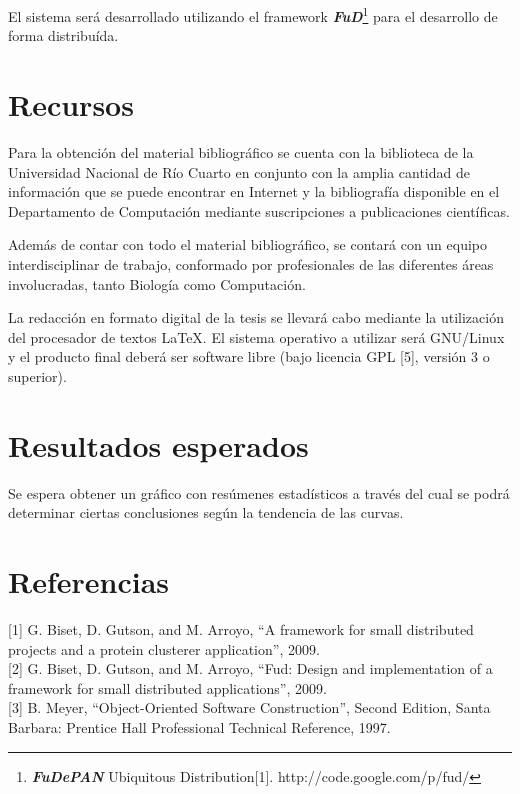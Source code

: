 \documentclass[12pt,a4paper]{article}
\begin{document}
\par El sistema será desarrollado utilizando el framework \textbf{\textit{FuD}}\footnote{\textbf{\textit{FuDePAN}} Ubiquitous Distribution[1]. http://code.google.com/p/fud/} para el desarrollo de forma distribuída.

\section{Recursos}

\par Para la obtención del material bibliográfico se cuenta con la biblioteca de la Universidad Nacional de Río Cuarto en conjunto con la amplia cantidad de información que se puede encontrar en Internet y la bibliografía disponible en el Departamento de Computación mediante suscripciones a publicaciones científicas.

\par Además de contar con todo el material bibliográfico, se contará con un equipo interdisciplinar de trabajo, conformado por profesionales de las diferentes áreas involucradas, tanto Biología como Computación. 

\par La redacción en formato digital de la tesis se llevará cabo mediante la utilización del procesador de textos \LaTeX. El sistema operativo a utilizar será GNU/Linux y el producto final deberá ser software libre (bajo licencia GPL [5], versión 3 o superior).

\section{Resultados esperados}
Se espera obtener un gráfico con resúmenes estadísticos a través del cual se podrá determinar ciertas conclusiones según la tendencia de las curvas. 

\section*{Referencias}
[1] G. Biset, D. Gutson, and M. Arroyo, “A framework for small distributed projects and a protein clusterer application”, 2009. \\

[2] G. Biset, D. Gutson, and M. Arroyo, “Fud: Design and implementation of a framework for small distributed applications”, 2009. \\

[3] B. Meyer, “Object-Oriented Software Construction”, Second Edition, Santa Barbara: Prentice Hall Professional Technical Reference, 1997. \\
\end{document}
